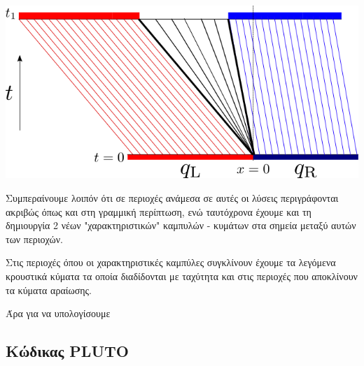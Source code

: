 \begin{marginfigure}
	\centering
	\includegraphics[width=1\linewidth]{Images/rarefuctionwave}
	\caption{}
	\label{fig:rarefuctionwave}
\end{marginfigure}

Συμπεραίνουμε λοιπόν ότι σε περιοχές ανάμεσα σε αυτές οι λύσεις περιγράφονται ακριβώς όπως και στη γραμμική περίπτωση, ενώ ταυτόχρονα έχουμε και τη δημιουργία 2 νέων "χαρακτηριστικών" καμπυλών - κυμάτων στα σημεία μεταξύ αυτών των περιοχών.

Στις περιοχές όπου οι χαρακτηριστικές καμπύλες συγκλίνουν έχουμε τα λεγόμενα κρουστικά κύματα τα οποία διαδίδονται με ταχύτητα  και στις περιοχές που αποκλίνουν τα κύματα αραίωσης.

Άρα για να υπολογίσουμε 





\subsection{Κώδικας PLUTO}

